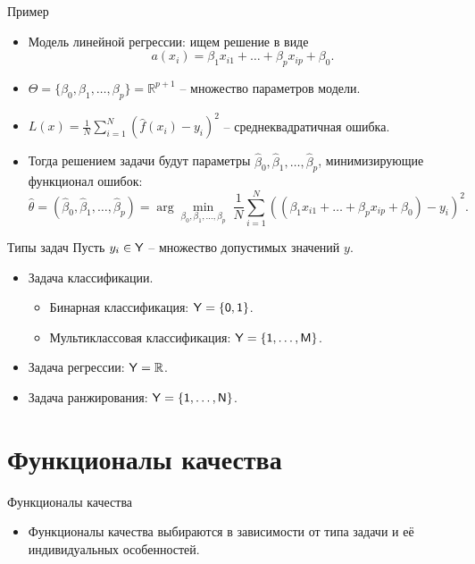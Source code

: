 \documentclass[9pt]{beamer}
\begin{document}
\begin{frame}{Пример}
\begin{itemize}
    \item Модель линейной регрессии: ищем решение в виде
    $$a(x_i) = \beta_1 x_{i1} + \ldots + \beta_p {x_{ip}} + \beta_0.$$
    \item $\Theta = \{\beta_0, \beta_1, \ldots, \beta_p\} = \mathbb{R}^{p+1}$ -- множество параметров модели.
    \item $L(x) = \frac{1}{N}\sum\limits_{i=1}^N(\hat f(x_i) - y_i)^2$ -- среднеквадратичная ошибка.
    \item Тогда решением задачи будут параметры $\hat\beta_0, \hat\beta_1, \ldots, \hat\beta_p$, минимизирующие функционал ошибок:
    $$\hat\theta = (\hat\beta_0, \hat\beta_1, \ldots, \hat\beta_p) = {\arg\min_{\beta_0, \beta_1,\ldots, \beta_p}}\;  \frac{1}{N}\sum\limits_{i=1}^N( (\beta_1 x_{i1}  + \ldots + \beta_p x_{ip} + \beta_0) - y_i)^2.$$
\end{itemize}
\end{frame}


\begin{frame}{Типы задач}
Пусть $y_i \in \sf{Y}$ -- множество допустимых значений $y$.
\begin{itemize}
    \item Задача классификации.
    \begin{itemize}
        \item Бинарная классификация: $\sf{Y} = \{0, 1\}$.
        \item Мультиклассовая классификация: $\sf{Y} = \{1, \ldots, M\}$.
    \end{itemize}
    \item Задача регрессии: $\sf{Y} = \mathbb{R}$.
    \item Задача ранжирования: $\sf{Y} = \{1, \ldots, N\}$.
\end{itemize}
    
\end{frame}

\section{Функционалы качества}

\begin{frame}{Функционалы качества}
\begin{itemize}
    \item Функционалы качества выбираются в зависимости от типа задачи и её индивидуальных особенностей.
\end{itemize}
\end{frame}
\end{document}
